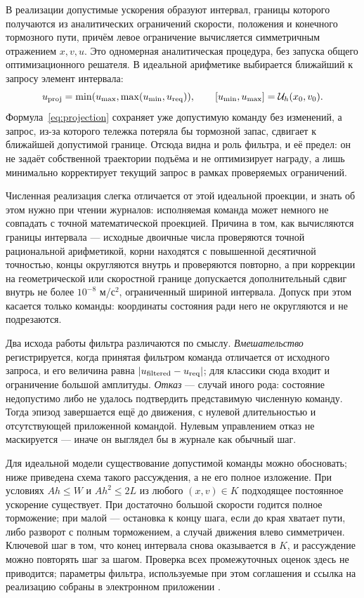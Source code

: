 В реализации допустимые ускорения образуют интервал, границы которого получаются из аналитических ограничений скорости, положения и конечного тормозного пути, причём левое ограничение вычисляется симметричным отражением $x,v,u$. Это одномерная аналитическая процедура, без запуска общего оптимизационного решателя. В идеальной арифметике выбирается ближайший к запросу элемент интервала:
\begin{equation}
u_{\rm proj}=\min(u_{\max},\max(u_{\min},u_{\rm req})),
\qquad [u_{\min},u_{\max}]=\mathcal U_h(x_0,v_0).
\label{eq:projection}
\end{equation}
Формула~\eqref{eq:projection} сохраняет уже допустимую команду без изменений, а запрос, из-за которого тележка потеряла бы тормозной запас, сдвигает к ближайшей допустимой границе. Отсюда видна и роль фильтра, и её предел: он не задаёт собственной траектории подъёма и не оптимизирует награду, а лишь минимально корректирует текущий запрос в рамках проверяемых ограничений.

Численная реализация слегка отличается от этой идеальной проекции, и знать об этом нужно при чтении журналов: исполняемая команда может немного не совпадать с точной математической проекцией. Причина в том, как вычисляются границы интервала — исходные двоичные числа проверяются точной рациональной арифметикой, корни находятся с повышенной десятичной точностью, концы округляются внутрь и проверяются повторно, а при коррекции на геометрической или скоростной границе допускается дополнительный сдвиг внутрь не более $10^{-8}$ м/с$^2$, ограниченный шириной интервала. Допуск при этом касается только команды: координаты состояния ради него не округляются и не подрезаются.

Два исхода работы фильтра различаются по смыслу. \emph{Вмешательство} регистрируется, когда принятая фильтром команда отличается от исходного запроса, и его величина равна $|u_{\rm filtered}-u_{\rm req}|$; для классики сюда входит и ограничение большой амплитуды. \emph{Отказ} — случай иного рода: состояние недопустимо либо не удалось подтвердить представимую численную команду. Тогда эпизод завершается ещё до движения, с нулевой длительностью и отсутствующей приложенной командой. Нулевым управлением отказ не маскируется — иначе он выглядел бы в журнале как обычный шаг.

Для идеальной модели существование допустимой команды можно обосновать; ниже приведена схема такого рассуждения, а не его полное изложение. При условиях $Ah\leq W$ и $Ah^2\leq2L$ из любого $(x,v)\in K$ подходящее постоянное ускорение существует. При достаточно большой скорости годится полное торможение; при малой — остановка к концу шага, если до края хватает пути, либо разворот с полным торможением, а случай движения влево симметричен. Ключевой шаг в том, что конец интервала снова оказывается в $K$, и рассуждение можно повторять шаг за шагом. Проверка всех промежуточных оценок здесь не приводится; параметры фильтра, используемые при этом соглашения и ссылка на реализацию собраны в электронном приложении .


